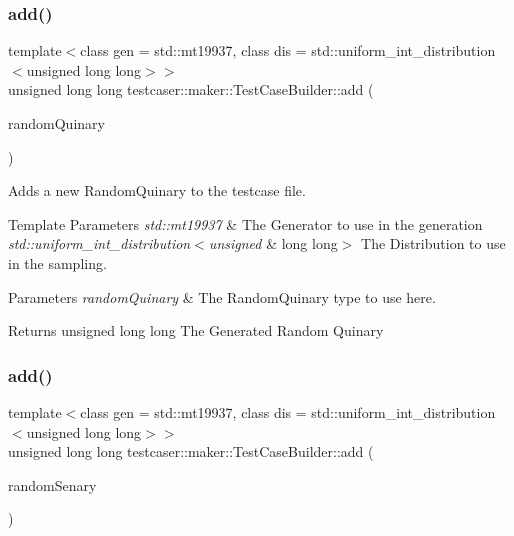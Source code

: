 \subsubsection{\texorpdfstring{add()}{add()}\hspace{0.1cm}{\footnotesize\ttfamily [8/11]}}
{\footnotesize\ttfamily template$<$class gen  = std\+::mt19937, class dis  = std\+::uniform\+\_\+int\+\_\+distribution$<$unsigned long long$>$$>$ \\
unsigned long long testcaser\+::maker\+::\+Test\+Case\+Builder\+::add (\begin{DoxyParamCaption}\item[{\hyperlink{structtestcaser_1_1maker_1_1types_1_1RandomQuinary}{types\+::\+Random\+Quinary}$<$ gen, dis $>$ \&}]{random\+Quinary }\end{DoxyParamCaption})\hspace{0.3cm}{\ttfamily [inline]}}



Adds a new Random\+Quinary to the testcase file. 


\begin{DoxyTemplParams}{Template Parameters}
{\em std\+::mt19937} & The Generator to use in the generation \\
\hline
{\em std\+::uniform\+\_\+int\+\_\+distribution$<$unsigned} & long long$>$ The Distribution to use in the sampling. \\
\hline
\end{DoxyTemplParams}

\begin{DoxyParams}{Parameters}
{\em random\+Quinary} & The Random\+Quinary type to use here. \\
\hline
\end{DoxyParams}
\begin{DoxyReturn}{Returns}
unsigned long long The Generated Random Quinary 
\end{DoxyReturn}
\mbox{\label{classtestcaser_1_1maker_1_1TestCaseBuilder_a60ef1510e12a3cc6018c7b198a2165e5}} 
\subsubsection{\texorpdfstring{add()}{add()}\hspace{0.1cm}{\footnotesize\ttfamily [9/11]}}
{\footnotesize\ttfamily template$<$class gen  = std\+::mt19937, class dis  = std\+::uniform\+\_\+int\+\_\+distribution$<$unsigned long long$>$$>$ \\
unsigned long long testcaser\+::maker\+::\+Test\+Case\+Builder\+::add (\begin{DoxyParamCaption}\item[{\hyperlink{structtestcaser_1_1maker_1_1types_1_1RandomSenary}{types\+::\+Random\+Senary}$<$ gen, dis $>$ \&}]{random\+Senary }\end{DoxyParamCaption})\hspace{0.3cm}{\ttfamily [inline]}}



